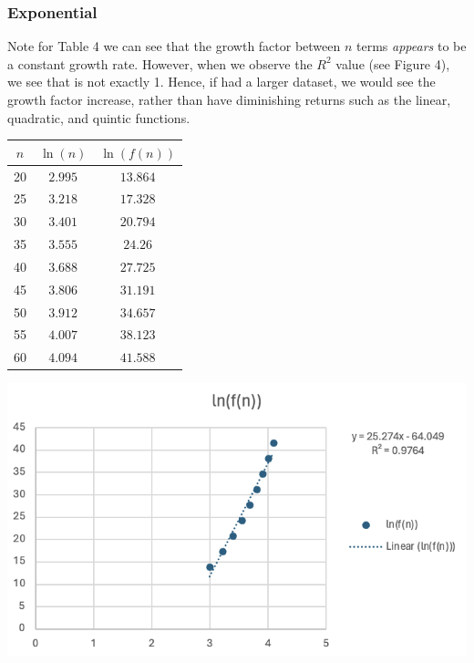 \documentclass{article}
\begin{document}
        \subsubsection{Exponential}

        Note for Table 4 we can see that the growth factor between $n$ terms \textit{appears} to be a constant growth rate. However, when we observe the $R^2$ value (see Figure 4), we see that is not exactly 1. Hence, if had a larger dataset, we would see the growth factor increase, rather than have diminishing returns such as the linear, quadratic, and quintic functions.


\begin{minipage}{0.3\textwidth} %
    \centering

    
    
    \begin{tabular}{c|c|c}
        $n$ & $\ln(n)$ & $\ln(f(n))$ \\ \hline
        20 & $2.995$ & $13.864$ \\\hline
        25 & $3.218$ & $17.328$  \\\hline
        30 & $3.401$ & $20.794$\\\hline
        35 & $3.555$ & $24.26$\\\hline
        40 & $3.688$ & $27.725$\\ \hline
        45 & $3.806$ & $31.191$\\ \hline
        50 & $3.912$ & $34.657$\\ \hline
        55 & $4.007$ & $38.123$\\ \hline
        60 & $4.094$ & $41.588$\\
    \end{tabular}

    
    
\end{minipage}%
\begin{minipage}{0.6\textwidth} %

    

    \centering
    \includegraphics[width=1\linewidth]{Graphs/2^n+5n^2+1.png} %

     
    
\end{minipage}
\end{document}
